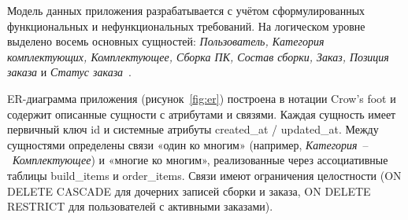 \documentclass[14pt, a4paper]{extarticle}
\begin{document}
Модель данных приложения разрабатывается с учётом сформулированных функциональных и нефункциональных требований. На логическом уровне выделено восемь основных сущностей: \emph{Пользователь, Категория комплектующих, Комплектующее, Сборка ПК, Состав сборки, Заказ, Позиция заказа} и \emph{Статус заказа}~\cite{markov2021}.

ER-диаграмма приложения (рисунок~\ref{fig:er}) построена в нотации Crow's foot и содержит описанные сущности с атрибутами и связями. Каждая сущность имеет первичный ключ id и системные атрибуты created\_at / updated\_at. Между сущностями определены связи «один ко многим» (например, \emph{Категория}~--~\emph{Комплектующее}) и «многие ко многим», реализованные через ассоциативные таблицы build\_items и order\_items. Связи имеют ограничения целостности (ON DELETE CASCADE для дочерних записей сборки и заказа, ON DELETE RESTRICT для пользователей с активными заказами).
\end{document}
